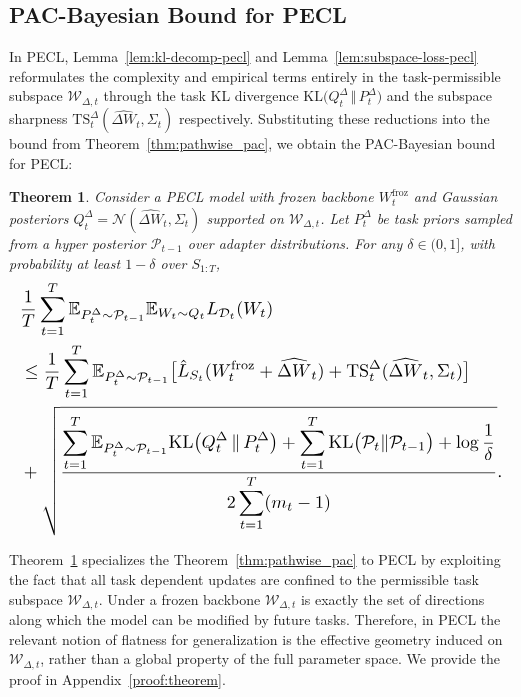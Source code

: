 \documentclass{article}
\theoremstyle{plain}
\newtheorem{theorem}{Theorem}[section]
\theoremstyle{definition}
\theoremstyle{remark}
\begin{document}
\subsection{PAC-Bayesian Bound for PECL}

In PECL, Lemma~\ref{lem:kl-decomp-pecl} and Lemma~\ref{lem:subspace-loss-pecl} reformulates the complexity and empirical terms entirely in the task-permissible subspace $\mathcal W_{\Delta,t}$ through the task KL divergence $\mathrm{KL}\bigl(Q_t^\Delta \,\Vert\, P_t^\Delta\bigr)$ and the subspace sharpness $\mathrm{TS}_t^{\Delta}(\widehat{\Delta W}_t,\Sigma_t)$ respectively. 
Substituting these reductions into the bound from Theorem~\ref{thm:pathwise_pac}, we obtain the PAC-Bayesian bound for PECL:
\begin{theorem}
\label{thm:pecl-bound}
Consider a PECL model with frozen backbone $W^{\mathrm{froz}}_t$ and Gaussian posteriors 
$Q_t^\Delta = \mathcal N(\widehat{\Delta W}_t,\Sigma_t)$ supported on $\mathcal W_{\Delta,t}$. 
Let $P_t^\Delta$ be task priors sampled from a hyper posterior $\mathcal P_{t-1}$ over adapter 
distributions. For any $\delta\in(0,1]$, with probability at least $1-\delta$ over $S_{1:T}$,
{%
\setlength{\abovedisplayskip}{2pt}
\setlength{\belowdisplayskip}{3pt}
\setlength{\abovedisplayshortskip}{3pt}
\setlength{\belowdisplayshortskip}{3pt}
\begin{equation*}
\label{eq:pecl-main-bound}
\resizebox{\linewidth}{!}{$
\begin{aligned}
&\frac{1}{T}\sum_{t=1}^T
\mathbb E_{P_t^\Delta\sim\mathcal P_{t-1}}
\mathbb E_{W_t\sim Q_t}
L_{\mathcal D_t}(W_t) \\
&\le
\frac{1}{T}\sum_{t=1}^T
\mathbb E_{P_t^\Delta\sim\mathcal P_{t-1}}
\bigl[
\hat L_{S_t}(W^{\mathrm{froz}}_t + \widehat{\Delta W}_t)
+
\mathrm{TS}_t^{\Delta}(\widehat{\Delta W}_t,\Sigma_t)
\bigr] \\
&+
\sqrt{
\frac{
\displaystyle
\sum_{t=1}^T
\mathbb E_{P_t^\Delta\sim\mathcal P_{t-1}}
\mathrm{KL}\bigl(Q_t^\Delta \,\Vert\, P_t^\Delta\bigr)
+
\sum_{t=1}^T
\mathrm{KL}\bigl(\mathcal P_t\Vert\mathcal P_{t-1}\bigr)
+
\log\frac{1}{\delta}}
{2\displaystyle\sum_{t=1}^T (m_t - 1)}
}.
\end{aligned}
$}
\end{equation*}
}
\end{theorem}
Theorem~\ref{thm:pecl-bound} specializes the Theorem~\ref{thm:pathwise_pac} to PECL by exploiting the fact that all task dependent updates are confined to the permissible task subspace $\mathcal W_{\Delta,t}$. 
Under a frozen backbone $\mathcal W_{\Delta,t}$ is exactly the set of directions along which the model can be modified by future tasks.
Therefore, in PECL the relevant notion of flatness for generalization is the effective geometry induced on $\mathcal W_{\Delta,t}$, rather than a global property of the full parameter space. We provide the proof in Appendix~\ref{proof:theorem}.
\end{document}

